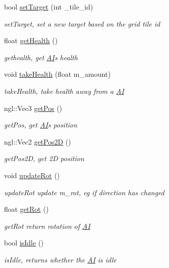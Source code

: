 \begin{DoxyCompactItemize}
bool \hyperlink{class_a_i_ab4e657a6832120bacba8c8ee411d4ddf}{set\+Target} (int \+\_\+tile\+\_\+id)
\begin{DoxyCompactList}\small\item\em set\+Target, set a new target based on the grid tile id \end{DoxyCompactList}\item 
float \hyperlink{class_a_i_ad2dca986cdfeac6c4ccdc2fa31fb2855}{get\+Health} ()
\begin{DoxyCompactList}\small\item\em gethealth, get \hyperlink{class_a_i}{A\+I}\textquotesingle{}s health \end{DoxyCompactList}\item 
void \hyperlink{class_a_i_a364a78bb417b943e083c38237b21824a}{take\+Health} (float m\+\_\+amount)
\begin{DoxyCompactList}\small\item\em take\+Health, take health away from a \hyperlink{class_a_i}{A\+I} \end{DoxyCompactList}\item 
ngl\+::\+Vec3 \hyperlink{class_a_i_a0d180bd6336d12a64708c50fd1830239}{get\+Pos} ()
\begin{DoxyCompactList}\small\item\em get\+Pos, get \hyperlink{class_a_i}{A\+I}\textquotesingle{}s position \end{DoxyCompactList}\item 
ngl\+::\+Vec2 \hyperlink{class_a_i_a5cf42ee567408414abd0891027fdf21a}{get\+Pos2\+D} ()
\begin{DoxyCompactList}\small\item\em get\+Pos2\+D, get 2\+D position \end{DoxyCompactList}\item 
\hypertarget{class_a_i_afd0023af3a765422d081f1974740fe6e}{}void \hyperlink{class_a_i_afd0023af3a765422d081f1974740fe6e}{update\+Rot} ()\label{class_a_i_afd0023af3a765422d081f1974740fe6e}

\begin{DoxyCompactList}\small\item\em update\+Rot update m\+\_\+rot, eg if direction has changed \end{DoxyCompactList}\item 
float \hyperlink{class_a_i_a78032a4a909bf3071547788d9a251a4f}{get\+Rot} ()
\begin{DoxyCompactList}\small\item\em get\+Rot return rotation of \hyperlink{class_a_i}{A\+I} \end{DoxyCompactList}\item 
bool \hyperlink{class_a_i_a64329bcb5cf1ce9d38587a5a9c2520a5}{is\+Idle} ()
\begin{DoxyCompactList}\small\item\em is\+Idle, returns whether the \hyperlink{class_a_i}{A\+I} is idle \end{DoxyCompactList}\end{DoxyCompactItemize}
